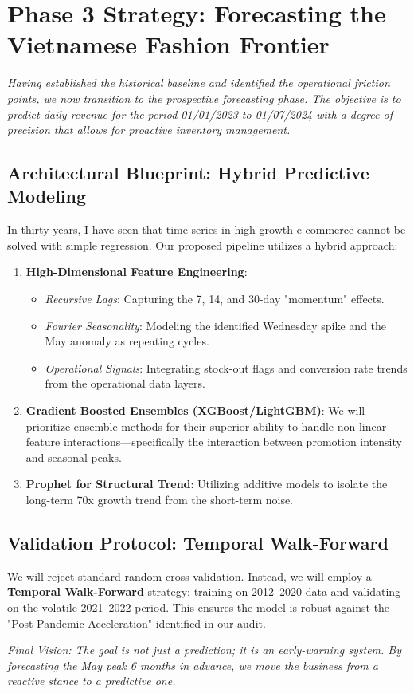 \section{Phase 3 Strategy: Forecasting the Vietnamese Fashion Frontier}

\textit{Having established the historical baseline and identified the operational friction points, we now transition to the prospective forecasting phase. The objective is to predict daily revenue for the period 01/01/2023 to 01/07/2024 with a degree of precision that allows for proactive inventory management.}

\subsection{Architectural Blueprint: Hybrid Predictive Modeling}
In thirty years, I have seen that time-series in high-growth e-commerce cannot be solved with simple regression. Our proposed pipeline utilizes a hybrid approach:

\begin{enumerate}
    \item \textbf{High-Dimensional Feature Engineering}:
    \begin{itemize}
        \item \textit{Recursive Lags}: Capturing the 7, 14, and 30-day "momentum" effects.
        \item \textit{Fourier Seasonality}: Modeling the identified Wednesday spike and the May anomaly as repeating cycles.
        \item \textit{Operational Signals}: Integrating stock-out flags and conversion rate trends from the operational data layers.
    \end{itemize}
    \item \textbf{Gradient Boosted Ensembles (XGBoost/LightGBM)}: We will prioritize ensemble methods for their superior ability to handle non-linear feature interactions—specifically the interaction between promotion intensity and seasonal peaks.
    \item \textbf{Prophet for Structural Trend}: Utilizing additive models to isolate the long-term 70x growth trend from the short-term noise.
\end{enumerate}

\subsection{Validation Protocol: Temporal Walk-Forward}
We will reject standard random cross-validation. Instead, we will employ a \textbf{Temporal Walk-Forward} strategy: training on 2012--2020 data and validating on the volatile 2021--2022 period. This ensures the model is robust against the "Post-Pandemic Acceleration" identified in our audit.

\textit{Final Vision: The goal is not just a prediction; it is an early-warning system. By forecasting the May peak 6 months in advance, we move the business from a reactive stance to a predictive one.}
